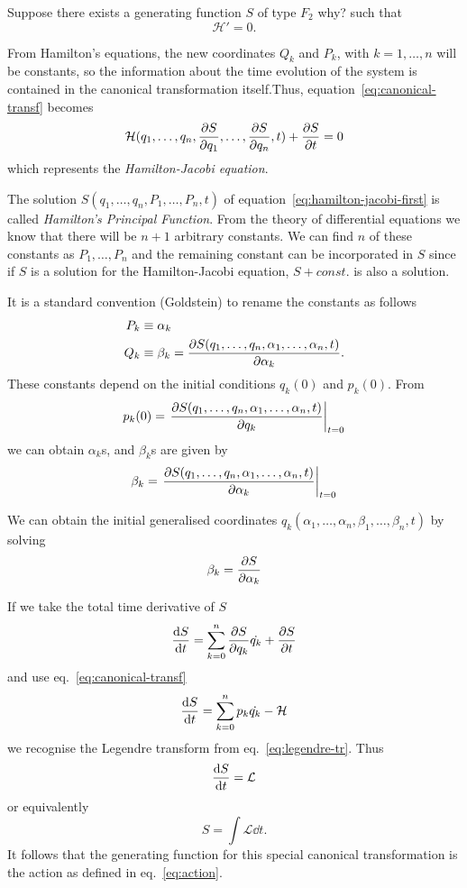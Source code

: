 \documentclass[../thesis.tex]{subfiles}
\begin{document}
Suppose there exists a generating function \(S\) of type \(F_2\) {\color{red}why?} such that
\[
  \mathcal{H'} = 0.
\]

From Hamilton's equations, the new coordinates \(Q_k\) and \(P_k\), with \(k=1,\dotsc,n\) will
be constants, so the information about the time evolution of the system is contained
in the canonical transformation itself.Thus, equation~\eqref{eq:canonical-transf} becomes
\begin{equation}
  \label{eq:hamilton-jacobi-first}
  \mathcal{H}(q_1,\dotsc,q_n,\pdv{S}{q_1},\dotsc,\pdv{S}{q_n},t) + \pdv{S}{t} = 0
\end{equation}
which represents the \emph{Hamilton-Jacobi equation}.

The solution \(S(q_1,\dotsc,q_n,P_1,\dotsc,P_n,t)\) of
equation~\eqref{eq:hamilton-jacobi-first} is called \emph{Hamilton's Principal Function}.
From the theory of differential equations we know that there will be \(n+1\) arbitrary constants.
We can find \(n\) of these constants as \(P_1,\dotsc,P_n\) and the remaining constant can be
incorporated in \(S\) since if \(S\) is a solution for the Hamilton-Jacobi equation,
\(S+const.\) is also a solution.

It is a standard convention (Goldstein) to rename the constants as follows
\begin{align*}
  P_k &\equiv \alpha_k \\
  Q_k &\equiv \beta_k = \pdv{S(q_1,\dotsc,q_n,\alpha_1,\dotsc,\alpha_n,t)}{\alpha_k}.
\end{align*}
These constants depend on the initial conditions \(q_k(0)\) and \(p_k(0)\). From
\[
  p_k(0) = \eval{\pdv{S(q_1,\dotsc,q_n,\alpha_1,\dotsc,\alpha_n,t)}{q_k}}_{t=0}
\]
we can obtain \(\alpha_k\)s, and \(\beta_k\)s are given by
\[
  \beta_k = \eval{\pdv{S(q_1,\dotsc,q_n,\alpha_1,\dotsc,\alpha_n,t)}{\alpha_k}}_{t=0}
\]

We can obtain the initial generalised coordinates
\(q_k(\alpha_1,\dotsc,\alpha_n,\beta_1,\dotsc,\beta_n,t)\) by solving
\[
  \beta_k=\pdv{S}{\alpha_k}
\]

If we take the total time derivative of \(S\)
\[
  \dv{S}{t} = \sum_{k=0}^{n} \pdv{S}{q_k} \dot{q_k} + \pdv{S}{t}
\]
and use eq.~\eqref{eq:canonical-transf}
\[
  \dv{S}{t} = \sum_{k=0}^{n} p_k \dot{q_k} - \mathcal{H}
\]
we recognise the Legendre transform from eq.~\eqref{eq:legendre-tr}. Thus
\[
  \dv{S}{t} = \mathcal{L}
\]
or equivalently
\[
  S = \int \mathcal{L} \dd{t}.
\]
It follows that the generating function for this special canonical transformation
is the action as defined in eq.~\eqref{eq:action}.
\end{document}
